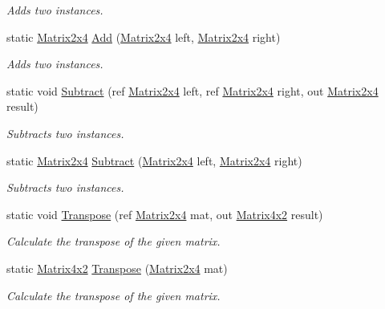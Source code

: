 \begin{DoxyCompactItemize}
\begin{DoxyCompactList}\small\item\em Adds two instances. \end{DoxyCompactList}\item 
static \hyperlink{struct_open_t_k_1_1_matrix2x4}{Matrix2x4} \hyperlink{struct_open_t_k_1_1_matrix2x4_af37c29b69f91d2fc67b956a6263a26b8}{Add} (\hyperlink{struct_open_t_k_1_1_matrix2x4}{Matrix2x4} left, \hyperlink{struct_open_t_k_1_1_matrix2x4}{Matrix2x4} right)
\begin{DoxyCompactList}\small\item\em Adds two instances. \end{DoxyCompactList}\item 
static void \hyperlink{struct_open_t_k_1_1_matrix2x4_afdbe17e194163f31140b93e3457545cd}{Subtract} (ref \hyperlink{struct_open_t_k_1_1_matrix2x4}{Matrix2x4} left, ref \hyperlink{struct_open_t_k_1_1_matrix2x4}{Matrix2x4} right, out \hyperlink{struct_open_t_k_1_1_matrix2x4}{Matrix2x4} result)
\begin{DoxyCompactList}\small\item\em Subtracts two instances. \end{DoxyCompactList}\item 
static \hyperlink{struct_open_t_k_1_1_matrix2x4}{Matrix2x4} \hyperlink{struct_open_t_k_1_1_matrix2x4_a44f464033a33dcd144ed0fa55b43a09a}{Subtract} (\hyperlink{struct_open_t_k_1_1_matrix2x4}{Matrix2x4} left, \hyperlink{struct_open_t_k_1_1_matrix2x4}{Matrix2x4} right)
\begin{DoxyCompactList}\small\item\em Subtracts two instances. \end{DoxyCompactList}\item 
static void \hyperlink{struct_open_t_k_1_1_matrix2x4_ab1365fc3f0286a0504921337b35c95a1}{Transpose} (ref \hyperlink{struct_open_t_k_1_1_matrix2x4}{Matrix2x4} mat, out \hyperlink{struct_open_t_k_1_1_matrix4x2}{Matrix4x2} result)
\begin{DoxyCompactList}\small\item\em Calculate the transpose of the given matrix. \end{DoxyCompactList}\item 
static \hyperlink{struct_open_t_k_1_1_matrix4x2}{Matrix4x2} \hyperlink{struct_open_t_k_1_1_matrix2x4_ad8342cdf2f4079cff0a337cd228512bf}{Transpose} (\hyperlink{struct_open_t_k_1_1_matrix2x4}{Matrix2x4} mat)
\begin{DoxyCompactList}\small\item\em Calculate the transpose of the given matrix. \end{DoxyCompactList}\item 

\end{DoxyCompactItemize}

